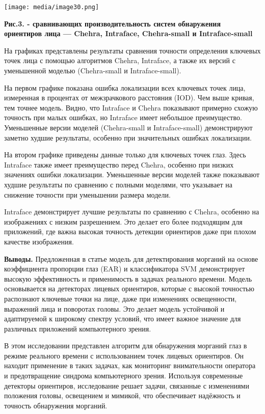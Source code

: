 \documentclass[
]{article}
\begin{document}
\texttt{[image: media/image30.png]}

\textbf{Рис.3. - сравнивающих производительность систем обнаружения
ориентиров лица --- Chehra, Intraface, Chehra-small и Intraface-small}

На графиках представлены результаты сравнения точности определения
ключевых точек лица с помощью алгоритмов Chehra, Intraface, а также их
версий с уменьшенной моделью (Chehra-small и Intraface-small).

На первом графике показана ошибка локализации всех ключевых точек лица,
измеренная в процентах от межзрачкового расстояния (IOD). Чем выше
кривая, тем точнее модель. Видно, что Intraface и Chehra показывают
примерно схожую точность при малых ошибках, но Intraface имеет небольшое
преимущество. Уменьшенные версии моделей (Chehra-small и
Intraface-small) демонстрируют заметно худшие результаты, особенно при
значительных ошибках локализации.

На втором графике приведены данные только для ключевых точек глаз. Здесь
Intraface также имеет преимущество перед Chehra, особенно при низких
значениях ошибки локализации. Уменьшенные версии моделей также
показывают худшие результаты по сравнению с полными моделями, что
указывает на снижение точности при уменьшении размера модели.

Intraface демонстрирует лучшие результаты по сравнению с Chehra,
особенно на изображениях с низким разрешением. Это делает его более
подходящим для приложений, где важна высокая точность детекции
ориентиров даже при плохом качестве изображения.

\textbf{Выводы.} Предложенная в статье модель для детектирования
морганий на основе коэффициента пропорции глаз (EAR) и классификатора
SVM демонстрирует высокую эффективность и применимость в задачах
реального времени. Модель основывается на детекторах лицевых ориентиров,
которые с высокой точностью распознают ключевые точки на лице, даже при
изменениях освещенности, выражений лица и поворотах головы. Это делает
модель устойчивой и адаптируемой к широкому спектру условий, что имеет
важное значение для различных приложений компьютерного зрения.

В этом исследовании представлен алгоритм для обнаружения морганий глаз в
режиме реального времени с использованием точек лицевых ориентиров. Он
находит применение в таких задачах, как мониторинг внимательности
оператора и предотвращение синдрома компьютерного зрения. Используя
современные детекторы ориентиров, исследование решает задачи, связанные
с изменениями положения головы, освещением и мимикой, что обеспечивает
надёжность и точность обнаружения морганий.
\end{document}
